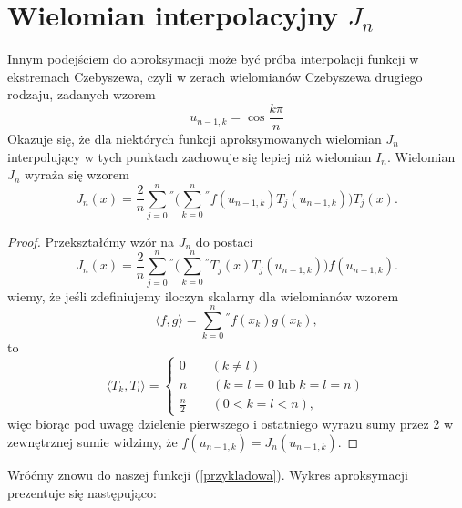 \documentclass[11pt,wide]{mwart}
\begin{document}
\section{Wielomian interpolacyjny $J_n$}
Innym podejściem do aproksymacji może być próba interpolacji funkcji w ekstremach Czebyszewa, czyli w zerach wielomianów Czebyszewa drugiego rodzaju, zadanych wzorem
\begin{equation}
u_{n-1, k} = \cos \frac{k\pi}{n}
\end{equation}
Okazuje się, że dla niektórych funkcji aproksymowanych wielomian $J_n$ interpolujący w tych punktach zachowuje się lepiej niż wielomian $I_n$.  Wielomian $J_n$ wyraża się wzorem
\begin{equation}
J_n(x) = \frac{2}{n} \sum_{j=0}^{n} {}^{''} \Big( \sum_{k=0}^n {}^{''} f(u_{n-1, k})T_j(u_{n-1,k})\Big) T_j(x).
\end{equation}
\begin{proof} \cite{j1}
Przekształćmy wzór na $J_n$ do postaci
\begin{equation}
J_n(x) = \frac{2}{n} \sum_{j=0}^{n} {}^{''} \Big( \sum_{k=0}^n {}^{''} T_j(x) T_j(u_{n-1,k})\Big)f(u_{n-1, k}).
\end{equation}
wiemy, że jeśli zdefiniujemy iloczyn skalarny dla wielomianów wzorem
\begin{equation}
\langle f, g \rangle = \sum_{k=0}^n {}^{''} f(x_k) g(x_k),
\end{equation}
to
\begin{equation}
\langle T_k, T_l \rangle =
\begin{cases}
0 \qquad (k \neq l) \\
n \qquad (k = l = 0 \;\text{lub}\; k = l = n) \\
\frac{n}{2} \qquad (0 < k = l < n),
\end{cases}
\end{equation}
więc biorąc pod uwagę dzielenie pierwszego i ostatniego wyrazu sumy przez 2 w zewnętrznej sumie widzimy, że $f(u_{n-1, k}) = J_n(u_{n-1,k})$.
\end{proof}
Wróćmy znowu do naszej funkcji (\ref{przykladowa}). Wykres aproksymacji prezentuje się następująco: 
\end{document}
